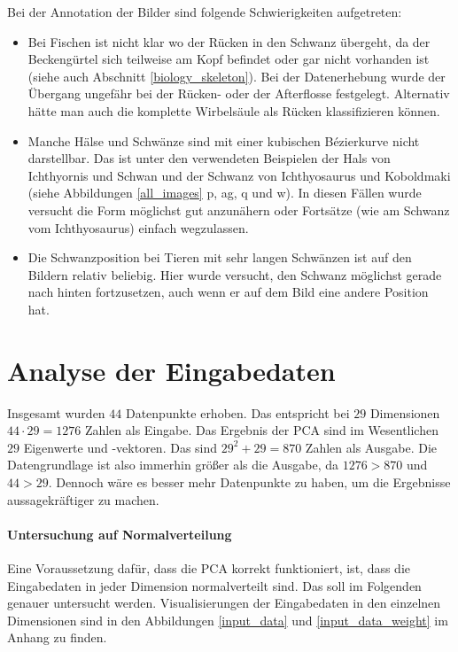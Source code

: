  Bei der Annotation der Bilder sind folgende Schwierigkeiten aufgetreten:
 \begin{itemize}
  \item Bei Fischen ist nicht klar wo der Rücken in den Schwanz übergeht, da der Beckengürtel sich teilweise am Kopf befindet oder gar nicht vorhanden ist (siehe auch Abschnitt \ref{biology_skeleton}). Bei der Datenerhebung wurde der Übergang ungefähr bei der Rücken- oder der Afterflosse festgelegt. Alternativ hätte man auch die komplette Wirbelsäule als Rücken klassifizieren können.
  
  \item Manche Hälse und Schwänze sind mit einer kubischen Bézierkurve nicht darstellbar. Das ist unter den verwendeten Beispielen der Hals von Ichthyornis und Schwan und der Schwanz von Ichthyosaurus und Koboldmaki (siehe Abbildungen \ref{all_images} p, ag, q und w). In diesen Fällen wurde versucht die Form möglichst gut anzunähern oder Fortsätze (wie am Schwanz vom Ichthyosaurus) einfach wegzulassen.
  
  \item Die Schwanzposition bei Tieren mit sehr langen Schwänzen ist auf den Bildern relativ beliebig. Hier wurde versucht, den Schwanz möglichst gerade nach hinten fortzusetzen, auch wenn er auf dem Bild eine andere Position hat.
 \end{itemize}
 
 
 \section{Analyse der Eingabedaten}
 \label{pca_input_analysis}
 
 Insgesamt wurden $44$ Datenpunkte erhoben. Das entspricht bei $29$ Dimensionen $44 \cdot 29 = 1276$ Zahlen als Eingabe. Das Ergebnis der PCA sind im Wesentlichen $29$ Eigenwerte und -vektoren. Das sind $29^2 + 29 = 870$ Zahlen als Ausgabe. Die Datengrundlage ist also immerhin größer als die Ausgabe, da $1276 > 870$ und $44 > 29$. Dennoch wäre es besser mehr Datenpunkte zu haben, um die Ergebnisse aussagekräftiger zu machen.
 
 \paragraph{Untersuchung auf Normalverteilung}
 Eine Voraussetzung dafür, dass die PCA korrekt funktioniert, ist, dass die Eingabedaten in jeder Dimension normalverteilt sind. Das soll im Folgenden genauer untersucht werden. Visualisierungen der Eingabedaten in den einzelnen Dimensionen sind in den Abbildungen \ref{input_data} und \ref{input_data_weight} im Anhang zu finden.
 

